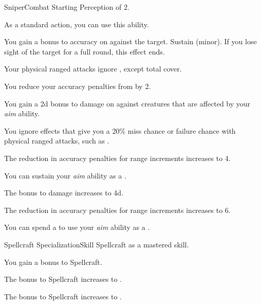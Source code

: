     \begin{feat}{Sniper}{Combat}
        \featpre Starting Perception of 2.
        \featben

         As a standard action, you can use this ability.
        \begin{ability}
            \begin{spelltargetinginfo}
            \end{spelltargetinginfo}
            \begin{spelleffects}
                \spelleffect You gain a  bonus to accuracy on  against the target.
                \spelldur Sustain (minor). If you lose sight of the target for a full round, this effect ends.
            \end{spelleffects}
        \end{ability}

         Your physical ranged attacks ignore , except total cover.

         You reduce your accuracy penalties from  by 2.

         You gain a \plus2d bonus to damage on  against \unaware creatures that are affected by your \textit{aim} ability.

         You ignore effects that give you a 20\% miss chance or failure chance with physical ranged attacks, such as .

         The reduction in accuracy penalties for range increments increases to 4.

         You can sustain your \textit{aim} ability as a .

         The bonus to damage increases to \plus4d.

         The reduction in accuracy penalties for range increments increases to 6.

         You can spend a  to use your \textit{aim} ability as a .
    \end{feat}

    \begin{feat}{Spellcraft Specialization}{Skill}
        \featpre Spellcraft as a mastered skill.
        \featben

         You gain a  bonus to Spellcraft.

         The bonus to Spellcraft increases to .

         The bonus to Spellcraft increases to .
    \end{feat}

